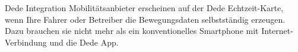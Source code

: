 
\bgroup


\begin{frame}{Dede Integration}
  Mobilitätsanbieter erscheinen auf der Dede Echtzeit-Karte, wenn Ihre Fahrer oder Betreiber die Bewegungsdaten selbstständig erzeugen. Dazu brauchen sie nicht mehr als ein konventionelles Smartphone mit Internet-Verbindung und die Dede App.
\end{frame}

\egroup
